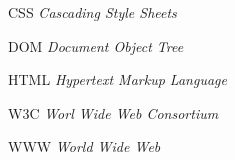 %
%

\begin{siglas}
    \item[CSS] \textit{Cascading Style Sheets}
    \item[DOM] \textit{Document Object Tree}    
    \item[HTML] \textit{Hypertext Markup Language}
    \item[W3C] \textit{Worl Wide Web Consortium}
    \item[WWW] \textit{World Wide Web}
\end{siglas}
